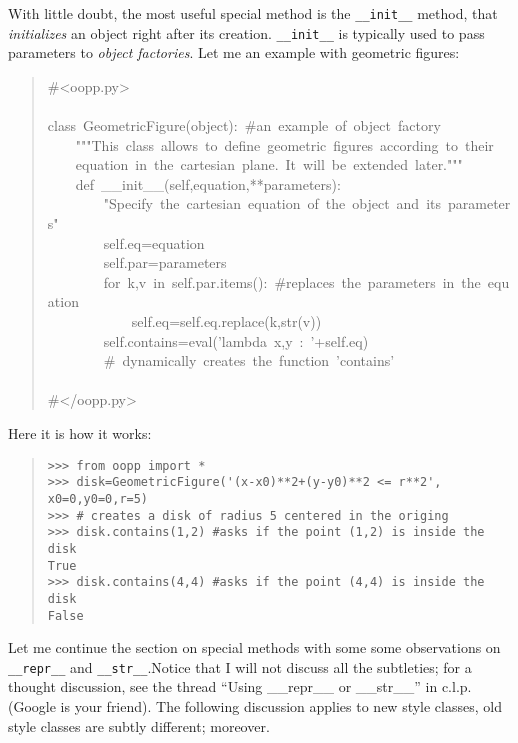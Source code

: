 \documentclass[10pt,english]{article}
\begin{document}
With little doubt, the most useful special method is the \texttt{{\_}{\_}init{\_}{\_}}
method, that \emph{initializes} an object right after its creation. \texttt{{\_}{\_}init{\_}{\_}}
is typically used to pass parameters to \emph{object factories}. Let me an
example with geometric figures:
\begin{quote}
\begin{ttfamily}\begin{flushleft}
\mbox{{\#}<oopp.py>}\\
\mbox{~~}\\
\mbox{class~GeometricFigure(object):~{\#}an~example~of~object~factory}\\
\mbox{~~~~"""This~class~allows~to~define~geometric~figures~according~to~their}\\
\mbox{~~~~equation~in~the~cartesian~plane.~It~will~be~extended~later."""}\\
\mbox{~~~~def~{\_}{\_}init{\_}{\_}(self,equation,**parameters):}\\
\mbox{~~~~~~~~"Specify~the~cartesian~equation~of~the~object~and~its~parameters"}\\
\mbox{~~~~~~~~self.eq=equation}\\
\mbox{~~~~~~~~self.par=parameters}\\
\mbox{~~~~~~~~for~k,v~in~self.par.items():~{\#}replaces~the~parameters~in~the~equation}\\
\mbox{~~~~~~~~~~~~self.eq=self.eq.replace(k,str(v))}\\
\mbox{~~~~~~~~self.contains=eval('lambda~x,y~:~'+self.eq)~}\\
\mbox{~~~~~~~~{\#}~dynamically~creates~the~function~'contains'}\\
\mbox{}\\
\mbox{{\#}</oopp.py>}
\end{flushleft}\end{ttfamily}
\end{quote}

Here it is how it works:
\begin{quote}
\begin{verbatim}>>> from oopp import *
>>> disk=GeometricFigure('(x-x0)**2+(y-y0)**2 <= r**2', x0=0,y0=0,r=5)
>>> # creates a disk of radius 5 centered in the origing
>>> disk.contains(1,2) #asks if the point (1,2) is inside the disk
True
>>> disk.contains(4,4) #asks if the point (4,4) is inside the disk
False\end{verbatim}
\end{quote}

Let me continue the section on special methods with some some observations on
\texttt{{\_}{\_}repr{\_}{\_}} and \texttt{{\_}{\_}str{\_}{\_}}.Notice that  I
will not discuss all the subtleties; for a thought discussion, see the
thread ``Using {\_}{\_}repr{\_}{\_} or {\_}{\_}str{\_}{\_}'' in c.l.p. (Google is your friend).
The following discussion applies to new style classes, old style classes 
are subtly different; moreover.
\end{document}

